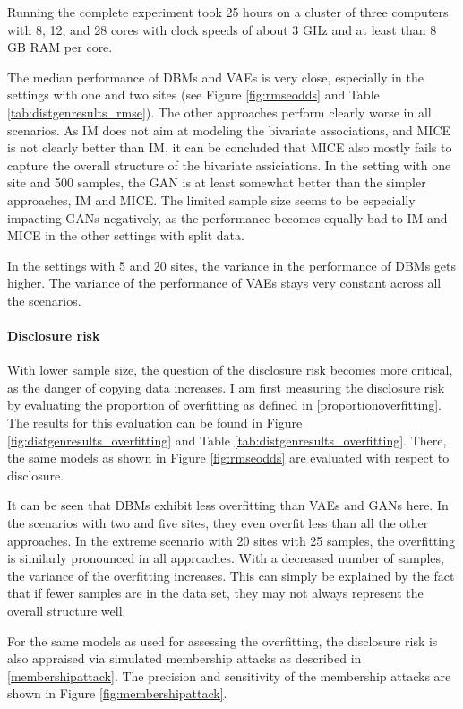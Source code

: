 \documentclass[12pt]{article}
\begin{document}
Running the complete experiment took 25 hours on a cluster of three computers with 8, 12, and 28 cores with clock speeds of about 3 GHz and at least than 8 GB RAM per core.

The median performance of DBMs and VAEs is very close, especially in the settings with one and two sites (see Figure \ref{fig:rmseodds} and Table \ref{tab:distgenresults_rmse}).
The other approaches perform clearly worse in all scenarios.
As IM does not aim at modeling the bivariate associations, and MICE is not clearly better than IM, it can be concluded that MICE also mostly fails to capture the overall structure of the bivariate assiciations.
In the setting with one site and 500 samples, the GAN is at least somewhat better than the simpler approaches, IM and MICE.
The limited sample size seems to be especially impacting GANs negatively, as the performance becomes equally bad to IM and MICE in the other settings with split data.

In the settings with 5 and 20 sites, the variance in the performance of DBMs gets higher.
The variance of the performance of VAEs stays very constant across all the scenarios.

\paragraph{Disclosure risk}
With lower sample size, the question of the disclosure risk becomes more critical, as the danger of copying data increases.
I am first measuring the disclosure risk by evaluating the proportion of overfitting as defined in \ref{proportionoverfitting}.
The results for this evaluation can be found in Figure \ref{fig:distgenresults_overfitting} and Table \ref{tab:distgenresults_overfitting}.
There, the same models as shown in Figure \ref{fig:rmseodds} are evaluated with respect to disclosure.

It can be seen that DBMs exhibit less overfitting than VAEs and GANs here.
In the scenarios with two and five sites, they even overfit less than all the other approaches.
In the extreme scenario with 20 sites with 25 samples, the overfitting is similarly pronounced in all approaches.
With a decreased number of samples, the variance of the overfitting increases. This can simply be explained by the fact that if fewer samples are in the data set, they may not always represent the overall structure well.

For the same models as used for assessing the overfitting, the disclosure risk is also appraised via simulated membership attacks as described in \ref{membershipattack}.
The precision and sensitivity of the membership attacks are shown in Figure \ref{fig:membershipattack}.
\end{document}
